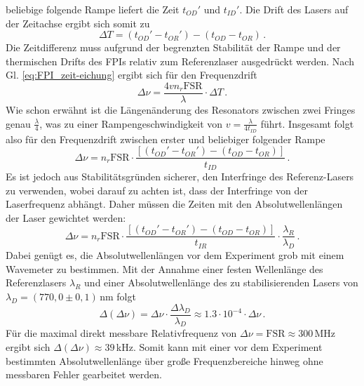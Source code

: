 beliebige folgende Rampe liefert die Zeit $t_{OD}'$ und $t_{ID}'$. Die Drift des
Lasers auf der Zeitachse ergibt sich somit zu
\begin{equation}\label{eq:FPI_zeitdrift}
	\Delta T=\left(t_{OD}'-t_{OR}'\right)-\left(t_{OD}-t_{OR}\right)\,.
\end{equation}
Die Zeitdifferenz muss aufgrund der begrenzten Stabilität der Rampe und der
thermischen Drifts des FPIs relativ zum Referenzlaser ausgedrückt werden. Nach
Gl.
\eqref{eq:FPI_zeit-eichung} ergibt sich für den Frequenzdrift
\begin{equation}\label{eq:FPI_frequenzdrift_01}
	\Delta\nu=\frac{4vn_r\text{FSR}}{\lambda}\cdot\Delta T\,.
\end{equation}
Wie schon erwähnt ist die Längenänderung des Resonators zwischen zwei Fringes
genau $\frac{\lambda}{4}$, was zu einer Rampengeschwindigkeit von
$v=\frac{\lambda}{4t_{ID}}$ führt. Insgesamt folgt also für den Frequenzdrift
zwischen erster und beliebiger folgender Rampe
\begin{equation}\label{eq:FPI_frequenzdrift_02}
	\Delta\nu=n_r\text{FSR}\cdot\frac{\left[\left(t_{OD}'-t_{OR}'\right)-\left(t_{OD}-t_{OR}\right)\right]}{t_{ID}}\,.
\end{equation}
Es ist jedoch aus Stabilitätsgründen sicherer, den Interfringe des
Referenz-Lasers zu verwenden, wobei darauf zu achten ist, dass der Interfringe
von der Laserfrequenz abhängt. Daher müssen die Zeiten mit den
Absolutwellenlängen der Laser gewichtet werden:
\begin{equation}\label{eq:FPI_frequenzdrift_03}
	\Delta\nu=n_r\text{FSR}\cdot\frac{\left[\left(t_{OD}'-t_{OR}'\right)-\left(t_{OD}-t_{OR}\right)\right]}{t_{IR}}\cdot\frac{\lambda_R}{\lambda_D}\,.
\end{equation}
Dabei genügt es, die Absolutwellenlängen vor dem Experiment grob mit einem
Wavemeter zu bestimmen. Mit der Annahme einer festen Wellenlänge
des Referenzlasers $\lambda_R$ und einer Absolutwellenlänge
des zu stabilisierenden Lasers von $\lambda_D=(770,0\pm0,1)\,$nm folgt
\begin{equation}\label{eq:FPI_frequenzdrift_fehler}
	\Delta(\Delta\nu)=\Delta\nu\cdot\frac{\Delta\lambda_D}{\lambda_D}\approx1.3\cdot10^{-4}\cdot\Delta\nu\,.
\end{equation}
Für die maximal direkt messbare Relativfrequenz von
$\Delta\nu=\text{FSR}\approx300\,$MHz ergibt sich
$\Delta(\Delta\nu)\approx39\,$kHz. Somit kann mit einer vor
dem Experiment bestimmten Absolutwellenlänge über große Frequenzbereiche hinweg
ohne messbaren Fehler gearbeitet werden.\par
